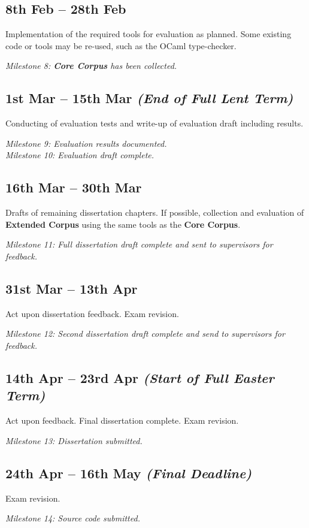 \subsection*{8th Feb -- 28th Feb}
Implementation of the required tools for evaluation as planned. Some existing code or tools may be re-used, such as the OCaml type-checker.\par
\textit{Milestone 8: \textbf{Core Corpus} has been collected.}

\subsection*{1st Mar -- 15th Mar \textit{(End of Full Lent Term)}}
Conducting of evaluation tests and write-up of evaluation draft including results.\par
\textit{Milestone 9: Evaluation results documented.}\\
\textit{Milestone 10: Evaluation draft complete.}

\subsection*{16th Mar -- 30th Mar}
Drafts of remaining dissertation chapters. If possible, collection and evaluation of \textbf{Extended Corpus} using the same tools as the \textbf{Core Corpus}.\par

\textit{Milestone 11: Full dissertation draft complete and sent to supervisors for feedback.}

\subsection*{31st Mar -- 13th Apr}
Act upon dissertation feedback. Exam revision.\par
\textit{Milestone 12: Second dissertation draft complete and send to supervisors for feedback.}

\subsection*{14th Apr -- 23rd Apr \textit{(Start of Full Easter Term)}}
Act upon feedback. Final dissertation complete. Exam revision.\par

\textit{Milestone 13: Dissertation submitted.}

\subsection*{24th Apr -- 16th May \textit{(Final Deadline)}}
Exam revision.\par
\textit{Milestone 14: Source code submitted.}

